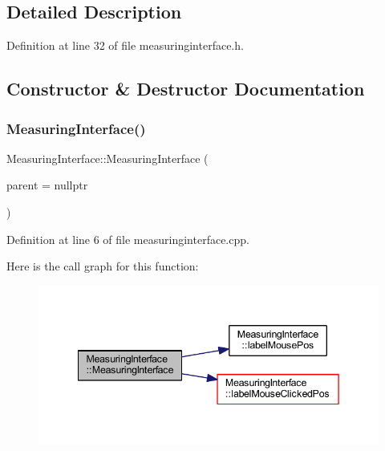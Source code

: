 \subsection{Detailed Description}


Definition at line 32 of file measuringinterface.\+h.



\subsection{Constructor \& Destructor Documentation}
\mbox{\label{classMeasuringInterface_ad1093726e69352028a38b18a5294a6ac}} 
\subsubsection{\texorpdfstring{MeasuringInterface()}{MeasuringInterface()}}
{\footnotesize\ttfamily Measuring\+Interface\+::\+Measuring\+Interface (\begin{DoxyParamCaption}\item[{Q\+Widget $\ast$}]{parent = {\ttfamily nullptr} }\end{DoxyParamCaption})\hspace{0.3cm}{\ttfamily [explicit]}}



Definition at line 6 of file measuringinterface.\+cpp.

Here is the call graph for this function\+:
\nopagebreak
\begin{figure}[H]
\begin{center}
\leavevmode
\includegraphics[width=342pt]{classMeasuringInterface_ad1093726e69352028a38b18a5294a6ac_cgraph}
\end{center}
\end{figure}
\mbox{\label{classMeasuringInterface_ac2538499814171168011c4e26731a084}} 
